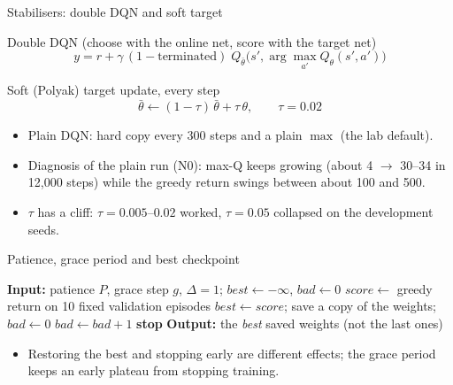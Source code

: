 \documentclass[aspectratio=169]{beamer}
\begin{document}
\begin{frame}{Stabilisers: double DQN and soft target}
\begin{block}{Double DQN (choose with the online net, score with the target net)}
\[
y=r+\gamma\,(1-\text{terminated})\;Q_{\bar\theta}\!\big(s',\arg\max_{a'}Q_\theta(s',a')\big)
\]
\end{block}
\begin{block}{Soft (Polyak) target update, every step}
\[
\bar\theta\leftarrow(1-\tau)\,\bar\theta+\tau\,\theta,\qquad \tau=0.02
\]
\end{block}
\begin{itemize}
  \item Plain DQN: hard copy every 300 steps and a plain $\max$ (the lab default).
  \item Diagnosis of the plain run (N0): max-Q keeps growing (about 4 $\to$ 30--34 in 12,000 steps) while the greedy return swings between about 100 and 500.
  \item $\tau$ has a cliff: $\tau=0.005$--$0.02$ worked, $\tau=0.05$ collapsed on the development seeds.
\end{itemize}
\end{frame}

\begin{frame}{Patience, grace period and best checkpoint}
\scriptsize
\begin{algorithm}[H]
\caption{Patience with a grace period (validation every 1,000 steps)}
\begin{algorithmic}[1]
\State \textbf{Input:} patience $P$, grace step $g$, $\Delta=1$; $best\leftarrow-\infty$, $bad\leftarrow0$
  \State $score\leftarrow$ greedy return on 10 fixed validation episodes
    \State $best\leftarrow score$; save a copy of the weights; $bad\leftarrow0$
    \State $bad\leftarrow bad+1$
  \EndIf
   \textbf{stop} \EndIf
\EndFor
\State \textbf{Output:} the \emph{best} saved weights (not the last ones)
\end{algorithmic}
\end{algorithm}
\normalsize
\begin{itemize}
  \item \alert{Restoring the best} and \alert{stopping early} are different effects; the grace period keeps an early plateau from stopping training.
\end{itemize}
\end{frame}
\end{document}
